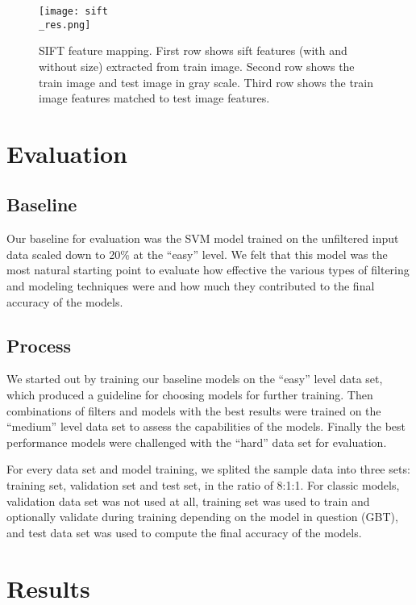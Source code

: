 \documentclass[
	a4paper, %
	10pt, %
	unnumberedsections, %
	twoside, %
]{t0004}
\begin{document}
\begin{figure}
	\texttt{[image: sift\\\_res.png]}
	\caption{SIFT feature mapping. First row shows sift features (with and without size) extracted from train image. Second row shows the train image and test image in gray scale. Third row shows the train image features matched to test image features.}
	\label{fig:siftres}
\end{figure}

\section{Evaluation}

\subsection{Baseline}

Our baseline for evaluation was the SVM model trained on the unfiltered input data scaled down to 20\% at the ``easy'' level. We felt that this model was the most natural starting point to evaluate how effective the various types of filtering and modeling techniques were and how much they contributed to the final accuracy of the models.

\subsection{Process}

We started out by training our baseline models on the ``easy'' level data set, which produced a guideline for choosing models for further training. Then combinations of filters and models with the best results were trained on the ``medium'' level data set to assess the capabilities of the models. Finally the best performance models were challenged with the ``hard'' data set for evaluation.

For every data set and model training, we splited the sample data into three sets: training set, validation set and test set, in the ratio of 8:1:1. For classic models, validation data set was not used at all, training set was used to train and optionally validate during training depending on the model in question (GBT), and test data set was used to compute the final accuracy of the models.

\section{Results}
\end{document}
